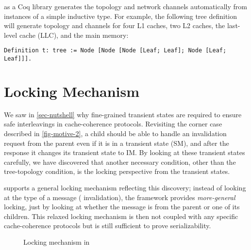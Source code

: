 \hemiola{} as a Coq library generates the topology and network channels automatically from instances of a simple inductive type.
For example, the following tree definition will generate topology and channels for four L1 caches, two L2 caches, the last-level cache (LLC), and the main memory:
\begin{lstlisting}[numbers=none, frame=none]
  Definition t: tree := Node [Node [Node [Leaf; Leaf]; Node [Leaf; Leaf]]].
\end{lstlisting}

\section{Locking Mechanism}
\label{sec-locking-mechanism}

We saw in \autoref{sec-nutshell} why fine-grained transient states are required to ensure safe interleavings in cache-coherence protocols.
Revisiting the corner case described in \autoref{fig-motive-2}, a child should be able to handle an invalidation request from the parent even if it is in a transient state (SM), and after the response it changes its transient state to IM.
By looking at these transient states carefully, we have discovered that another necessary condition, other than the tree-topology condition, is the locking perspective from the transient states.

\hemiola{} supports a general locking mechanism reflecting this discovery;
instead of looking at the type of a message (\eg{} invalidation), the framework provides \emph{more-general} locking, just by looking at whether the message is from the parent or one of its children.
This relaxed locking mechanism is then not coupled with any specific cache-coherence protocols but is still sufficient to prove serializability.

\begin{figure}[h]
  \centering
  \caption{Locking mechanism in \hemiola{}}
  \label{fig-locking}
\end{figure}

